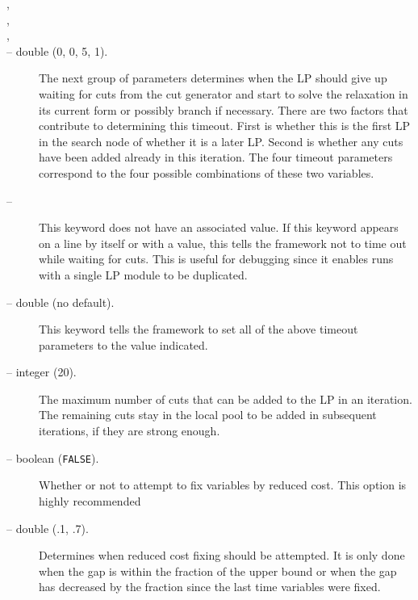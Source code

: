 \begin{description}
\item[,]
\item[,]
\item[,]
\item[ --
double (0, 0, 5, 1).]
The next group of parameters determines when the LP should give up
waiting for cuts from the cut generator and start to solve the
relaxation in its current form or possibly branch if necessary. There
are two factors that contribute to determining this timeout. First
is whether this is the first LP in the search node of whether it is a
later LP. Second is whether any cuts have been added already in this
iteration. The four timeout parameters correspond to the four possible
combinations of these two variables.

\item[ -- ]
This keyword does not have an associated value. If this keyword
appears on a line by itself or with a value, this tells the framework
not to time out while waiting for cuts. This is useful for debugging
since it enables runs with a single LP module to be duplicated.

\item[ -- double (no default).]
This keyword tells the framework to set all of the above timeout
parameters to the value indicated.

\item[ -- integer (20).]
The maximum number of cuts that can be added to the LP in an
iteration. The remaining cuts stay in the local pool to be added in
subsequent iterations, if they are strong enough.

\item[ -- boolean ({\tt FALSE}).]
Whether or not to attempt to fix variables by reduced cost. This
option is highly recommended

\item[ -- double (.1, .7).]
Determines when reduced cost fixing should be attempted. It is only
done when the gap is within the fraction  of the upper
bound or when the gap has decreased by the fraction 
 since the last time variables were fixed.


\end{description}
